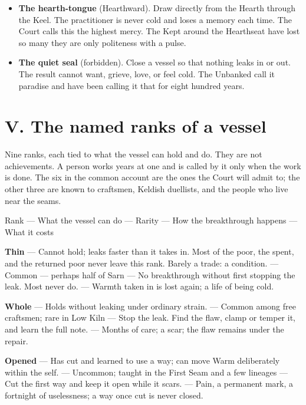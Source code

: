 \documentclass{design/chronicle}
\begin{document}
\begin{itemize}[leftmargin=1.4em,itemsep=1pt,topsep=3pt,parsep=0pt]
\item \textbf{The hearth-tongue} (Hearthward). Draw directly from the Hearth through the Keel. The practitioner is never cold and loses a memory each time. The Court calls this the highest mercy. The Kept around the Hearthseat have lost so many they are only politeness with a pulse.

\item \textbf{The quiet seal} (forbidden). Close a vessel so that nothing leaks in or out. The result cannot want, grieve, love, or feel cold. The Unbanked call it paradise and have been calling it that for eight hundred years.

\end{itemize}

\section*{V. The named ranks of a vessel}

Nine ranks, each tied to what the vessel can hold and do. They are not achievements. A person works years at one and is called by it only when the work is done. The six in the common account are the ones the Court will admit to; the other three are known to craftsmen, Keldish duellists, and the people who live near the seams.

Rank — What the vessel can do — Rarity — How the breakthrough happens — What it costs\par

\textbf{Thin} — Cannot hold; leaks faster than it takes in. Most of the poor, the spent, and the returned poor never leave this rank. Barely a trade: a condition. — Common — perhaps half of Sarn — No breakthrough without first stopping the leak. Most never do. — Warmth taken in is lost again; a life of being cold.\par

\textbf{Whole} — Holds without leaking under ordinary strain. — Common among free craftsmen; rare in Low Kiln — Stop the leak. Find the flaw, clamp or temper it, and learn the full note. — Months of care; a scar; the flaw remains under the repair.\par

\textbf{Opened} — Has cut and learned to use a way; can move Warm deliberately within the self. — Uncommon; taught in the First Seam and a few lineages — Cut the first way and keep it open while it scars. — Pain, a permanent mark, a fortnight of uselessness; a way once cut is never closed.\par
\end{document}
